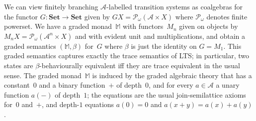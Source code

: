 \documentclass[a4paper,UKenglish,cleveref,thm-restate,numberwithinsect,final]{lipics-v2021}
\newcommand{\pow}{\mathcal{P}}
\newcommand{\powf}{\pow_{\omega}}
\theoremstyle{plain}
\numberwithin{equation}{section}
\newcommand{\monad}{{\mathbb{M}}}
\newcommand{\Set}{\mathbf{Set}}
\newcommand{\+}[1]{\mathcal{#1}\xspace}
\theoremstyle{definition}
\newcommand{\Act}{\mathcal{A}}
\begin{document}
\begin{example}
  \label{expl:traces}
  We can view finitely branching $\Act$-labelled transition systems as
  coalgebras for the functor \(G\colon \Set \to \Set\) given by
  $GX = \powf(\Act \times X)$ where $\powf$ denotes finite
  powerset. We have a graded monad~$\monad$ with functors~$M_n$ given
  on objects by \(M_nX = \powf(\Act^n \times X)\) and with evident
  unit and multiplications, and obtain a graded semantics
  $(\monad,\beta)$ for~$G$ where \(\beta\) is just the identity on
  $G=M_1$. This graded semantics captures exactly the trace semantics
  of LTS; in particular, two states are $\beta$-behaviourally
  equivalent iff they are trace equivalent in the usual sense. The
  graded monad~$\monad$ is induced by the graded algebraic theory that
  has a constant~$0$ and a binary function~$+$ of depth~$0$, and for
  every $a\in\Act$ a unary function $a(-)$ of depth~$1$; the equations
  are the usual join-semilattice axioms for~$0$ and~$+$, and depth-$1$
  equations $a(0)=0$ and $a(x+y)=a(x)+a(y)$.
\end{example}
\end{document}
